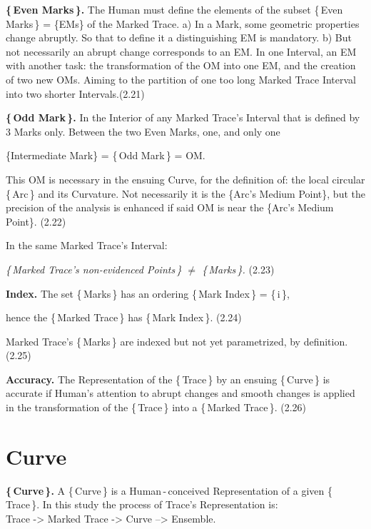 \documentclass[12pt]{article} %
\begin{document}
\noindent \textbf{\{\,Even Marks\,\}.} The Human must define the elements of the subset \{\,Even Marks\,\} = \{EMs\} of the Marked Trace. a) In a Mark, some geometric properties change abruptly. So that to define it a distinguishing EM is mandatory. b) But not necessarily an abrupt change corresponds to an EM. In one Interval, an EM with another task: the transformation of the OM into one EM, and the creation of two new OMs. Aiming to the partition of one too long Marked Trace Interval into two shorter Intervals.\qquad (2.21)  

\noindent \textbf{\{\,Odd Mark\,\}.} In the Interior of any Marked Trace's Interval that is defined by 3 Marks only. Between the two Even Marks, one, and only one

\noindent \{Intermediate Mark\} = \{\,Odd Mark\,\} = OM.  

\noindent This OM is necessary in the ensuing Curve, for the definition of: the local circular \{\,Arc\,\} and its Curvature. Not necessarily it is the \{Arc's Medium Point\}, but the precision of the analysis is enhanced if said OM is near the \{Arc's Medium Point\}. \qquad (2.22) 

\noindent In the same Marked Trace's Interval:

\noindent \textsl{\{\,Marked Trace's non-evidenced Points\,\} $\neq$ \{\,Marks\,\}.} \qquad \qquad \qquad \quad (2.23)

\noindent \textbf{Index.} The set \{\,Marks\,\} has an ordering \{\,Mark Index\,\} = \{\,i\,\},

\noindent hence the \{\,Marked Trace\,\} has \{\,Mark Index\,\}. \;\qquad (2.24)

\noindent Marked Trace's \{\,Marks\,\} are indexed but not yet parametrized, by definition. \qquad (2.25)

\textbf{Accuracy.} The Representation of the \{\,Trace\,\} by an ensuing \{\,Curve\,\} is accurate if Human's attention to abrupt changes and smooth changes is applied in the transformation of the \{\,Trace\,\} into a \{\,Marked Trace\,\}. \qquad (2.26)

 \section{Curve}
 
\noindent \textbf{\{\,Curve\,\}.} A \{\,Curve\,\} is a Human\,-\,conceived Representation of a given \{\,Trace\,\}. In this study the process of Trace's Representation is:\\Trace -> Marked Trace -> Curve --> Ensemble.  
  
\end{document}
